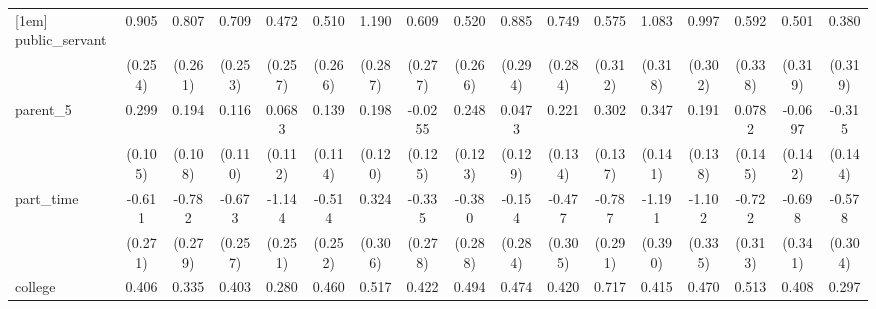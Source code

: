 {\begin{tabular}{l*{16}{c}}
[1em]
public\_servant      &       0.905\sym{***}&       0.807\sym{**} &       0.709\sym{**} &       0.472         &       0.510         &       1.190\sym{***}&       0.609\sym{*}  &       0.520         &       0.885\sym{**} &       0.749\sym{**} &       0.575         &       1.083\sym{***}&       0.997\sym{***}&       0.592         &       0.501         &       0.380         \\
                    &     (0.254)         &     (0.261)         &     (0.253)         &     (0.257)         &     (0.266)         &     (0.287)         &     (0.277)         &     (0.266)         &     (0.294)         &     (0.284)         &     (0.312)         &     (0.318)         &     (0.302)         &     (0.338)         &     (0.319)         &     (0.319)         \\
[1em]
parent\_5            &       0.299\sym{**} &       0.194         &       0.116         &      0.0683         &       0.139         &       0.198         &     -0.0255         &       0.248\sym{*}  &      0.0473         &       0.221         &       0.302\sym{*}  &       0.347\sym{*}  &       0.191         &      0.0782         &     -0.0697         &      -0.315\sym{*}  \\
                    &     (0.105)         &     (0.108)         &     (0.110)         &     (0.112)         &     (0.114)         &     (0.120)         &     (0.125)         &     (0.123)         &     (0.129)         &     (0.134)         &     (0.137)         &     (0.141)         &     (0.138)         &     (0.145)         &     (0.142)         &     (0.144)         \\
[1em]
part\_time           &      -0.611\sym{*}  &      -0.782\sym{**} &      -0.673\sym{**} &      -1.144\sym{***}&      -0.514\sym{*}  &       0.324         &      -0.335         &      -0.380         &      -0.154         &      -0.477         &      -0.787\sym{**} &      -1.191\sym{**} &      -1.102\sym{***}&      -0.722\sym{*}  &      -0.698\sym{*}  &      -0.578         \\
                    &     (0.271)         &     (0.279)         &     (0.257)         &     (0.251)         &     (0.252)         &     (0.306)         &     (0.278)         &     (0.288)         &     (0.284)         &     (0.305)         &     (0.291)         &     (0.390)         &     (0.335)         &     (0.313)         &     (0.341)         &     (0.304)         \\
[1em]
college             &       0.406\sym{**} &       0.335\sym{*}  &       0.403\sym{**} &       0.280\sym{*}  &       0.460\sym{**} &       0.517\sym{***}&       0.422\sym{**} &       0.494\sym{**} &       0.474\sym{**} &       0.420\sym{*}  &       0.717\sym{***}&       0.415\sym{*}  &       0.470\sym{**} &       0.513\sym{**} &       0.408\sym{*}  &       0.297         \\

\end{tabular}}
